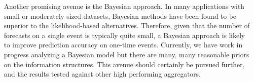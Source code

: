 \documentclass[12pt]{article}
\theoremstyle{definition}
\theoremstyle{definition}
\begin{document}
Another promising avenue is the Bayesian approach. In many applications with small or moderately sized datasets, Bayesian methods have been found to be superior to the likelihood-based alternatives. Therefore, given that the number of forecasts on a single event is typically quite small, a Bayesian approach is likely to improve prediction accuracy on one-time events. Currently, we have
work in progress analyzing a Bayesian model but there are many, many
reasonable priors on the information structures. 
 This avenue should
certainly be pursued further, and the results tested against other high
performing aggregators.





%
%

\end{document}
